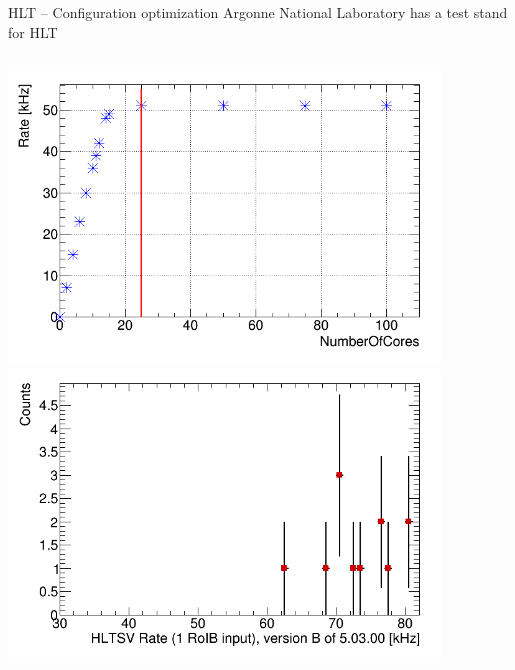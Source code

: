 \documentclass[10pt]{beamer}
\begin{document}
\begin{frame}{HLT -- Configuration optimization}
\centering
{\large\color{blue} Argonne National Laboratory has a test stand for HLT}
\begin{columns}
	\begin{column}{0.45\linewidth}
\includegraphics[width=\linewidth]{figures/dcmVsRate.png}\\
\includegraphics[width=\linewidth]{figures/h_reinerOne.png}\\
	\end{column}
	\begin{column}{0.45\linewidth}
\begin{figure}

\end{figure}
\end{column}
\end{columns}
\end{frame}
\end{document}
